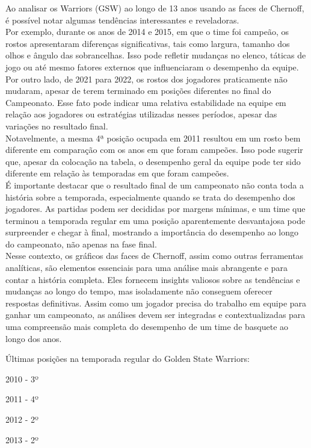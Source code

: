\documentclass[
]{book}
\begin{document}
Ao analisar os Warriors (GSW) ao longo de 13 anos usando as faces de Chernoff, é possível notar algumas tendências interessantes e reveladoras.\\
Por exemplo, durante os anos de 2014 e 2015, em que o time foi campeão, os rostos apresentaram diferenças significativas, tais como largura, tamanho dos olhos e ângulo das sobrancelhas. Isso pode refletir mudanças no elenco, táticas de jogo ou até mesmo fatores externos que influenciaram o desempenho da equipe.\\
Por outro lado, de 2021 para 2022, os rostos dos jogadores praticamente não mudaram, apesar de terem terminado em posições diferentes no final do Campeonato. Esse fato pode indicar uma relativa estabilidade na equipe em relação aos jogadores ou estratégias utilizadas nesses períodos, apesar das variações no resultado final.\\
Notavelmente, a mesma 4ª posição ocupada em 2011 resultou em um rosto bem diferente em comparação com os anos em que foram campeões. Isso pode sugerir que, apesar da colocação na tabela, o desempenho geral da equipe pode ter sido diferente em relação às temporadas em que foram campeões.\\
É importante destacar que o resultado final de um campeonato não conta toda a história sobre a temporada, especialmente quando se trata do desempenho dos jogadores. As partidas podem ser decididas por margens mínimas, e um time que terminou a temporada regular em uma posição aparentemente desvantajosa pode surpreender e chegar à final, mostrando a importância do desempenho ao longo do campeonato, não apenas na fase final.\\
Nesse contexto, os gráficos das faces de Chernoff, assim como outras ferramentas analíticas, são elementos essenciais para uma análise mais abrangente e para contar a história completa. Eles fornecem insights valiosos sobre as tendências e mudanças ao longo do tempo, mas isoladamente não conseguem oferecer respostas definitivas. Assim como um jogador precisa do trabalho em equipe para ganhar um campeonato, as análises devem ser integradas e contextualizadas para uma compreensão mais completa do desempenho de um time de basquete ao longo dos anos.

Últimas posições na temporada regular do Golden State Warriors:

2010 - 3º

2011 - 4º

2012 - 2º

2013 - 2º
\end{document}
